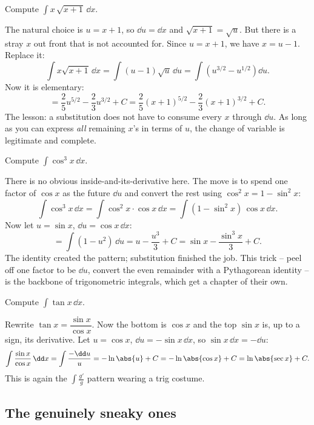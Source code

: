 \begin{example}
\label{ch22:ex-stray}
Compute $\displaystyle \int x\,\sqrt{x+1}\,\dd x$.

The natural choice is $u = x+1$, so $\dd u = \dd x$ and $\sqrt{x+1} = \sqrt u$. But
there is a stray $x$ out front that is not accounted for. Since $u = x+1$, we have
$x = u-1$. Replace it:
\[
  \int x\sqrt{x+1}\,\dd x = \int (u-1)\sqrt u\,\dd u
   = \int \left(u^{3/2} - u^{1/2}\right)\dd u.
\]
Now it is elementary:
\[
  = \frac{2}{5}u^{5/2} - \frac{2}{3}u^{3/2} + C
  = \frac{2}{5}(x+1)^{5/2} - \frac{2}{3}(x+1)^{3/2} + C.
\]
The lesson: a substitution does not have to consume every $x$ through $\dd u$. As
long as you can express \emph{all} remaining $x$'s in terms of $u$, the change of
variable is legitimate and complete.
\end{example}

\begin{example}
\label{ch22:ex-trigid}
Compute $\displaystyle \int \cos^3 x\,\dd x$.

There is no obvious inside-and-its-derivative here. The move is to spend one factor
of $\cos x$ as the future $\dd u$ and convert the rest using
$\cos^2 x = 1 - \sin^2 x$:
\[
  \int \cos^3 x\,\dd x = \int \cos^2 x\cdot \cos x\,\dd x
   = \int (1-\sin^2 x)\,\cos x\,\dd x.
\]
Now let $u = \sin x$, $\dd u = \cos x\,\dd x$:
\[
  = \int (1-u^2)\,\dd u = u - \frac{u^3}{3} + C
  = \sin x - \frac{\sin^3 x}{3} + C.
\]
The identity created the pattern; substitution finished the job. This trick --
peel off one factor to be $\dd u$, convert the even remainder with a Pythagorean
identity -- is the backbone of trigonometric integrals, which get a chapter of
their own.
\end{example}

\begin{example}
\label{ch22:ex-tan}
Compute $\displaystyle \int \tan x\,\dd x$.

Rewrite $\tan x = \dfrac{\sin x}{\cos x}$. Now the bottom is $\cos x$ and the top
$\sin x$ is, up to a sign, its derivative. Let $u = \cos x$, $\dd u = -\sin x\,\dd
x$, so $\sin x\,\dd x = -\dd u$:
\[
  \int \frac{\sin x}{\cos x}\,\dd x = \int \frac{-\dd u}{u}
   = -\ln\abs{u} + C = -\ln\abs{\cos x} + C = \ln\abs{\sec x} + C.
\]
This is again the $\int \frac{g'}{g}$ pattern wearing a trig costume.
\end{example}

\subsection{The genuinely sneaky ones}


